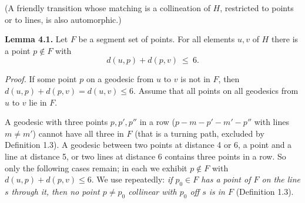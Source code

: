 \documentclass[
  11pt,
]{article}
\begin{document}
(A friendly transition whose matching is a collineation of \(H\), restricted to points or to lines, is also
automorphic.)

\textbf{Lemma 4.1.} Let \(F\) be a segment set of points. For all elements \(u, v\) of \(H\) there is a point
\(p\notin F\) with \[d(u,p) + d(p,v)\ \le\ 6 .\]

\emph{Proof.} If some point \(p\) on a geodesic from \(u\) to \(v\) is not in \(F\), then
\(d(u,p)+d(p,v) = d(u,v)\le 6\). Assume that all points on all geodesics from \(u\) to \(v\) lie in \(F\).

A geodesic with three points \(p, p', p''\) in a row (\(p - m - p' - m' - p''\) with lines \(m\ne m'\)) cannot have all
three in \(F\) (that is a turning path, excluded by Definition 1.3). A geodesic between two points at distance 4 or 6, a
point and a line at distance 5, or two lines at distance 6 contains three points in a row. So only the following cases
remain; in each we exhibit \(p\notin F\) with \(d(u,p)+d(p,v)\le 6\). We use repeatedly: \emph{if \(p_0\in F\) has a
point of \(F\) on the line \(s\) through it, then no point \(p\ne p_0\) collinear with \(p_0\) off \(s\) is in \(F\)}
(Definition 1.3).
\end{document}
